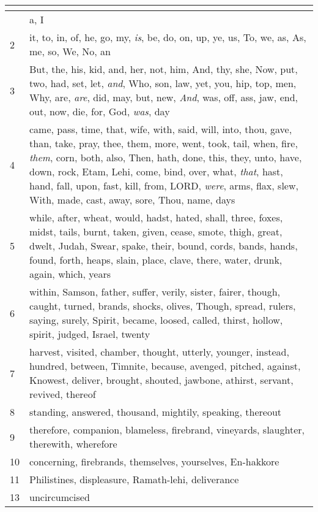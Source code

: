 \begin{center}
\begin{longtable}{l|p{3.75in}}
\hline \multicolumn{2}{c}{{ }} \\ \hline
\endfoot 
1 & a, I\\ \hline 
2 & it, to, in, of, he, go, my, \emph{is}, be, do, on, up, ye, us, To, we, as, As, me, so, We, No, an\\ \hline 
3 & But, the, his, kid, and, her, not, him, And, thy, she, Now, put, two, had, set, let, \emph{and}, Who, son, law, yet, you, hip, top, men, Why, are, \emph{are}, did, may, but, new, \emph{And}, was, off, ass, jaw, end, out, now, die, for, God, \emph{was}, day\\ \hline 
4 & came, pass, time, that, wife, with, said, will, into, thou, gave, than, take, pray, thee, them, more, went, took, tail, when, fire, \emph{them}, corn, both, also, Then, hath, done, this, they, unto, have, down, rock, Etam, Lehi, come, bind, over, what, \emph{that}, hast, hand, fall, upon, fast, kill, from, LORD, \emph{were}, arms, flax, slew, With, made, cast, away, sore, Thou, name, days\\ \hline 
5 & while, after, wheat, would, hadst, hated, shall, three, foxes, midst, tails, burnt, taken, given, cease, smote, thigh, great, dwelt, Judah, Swear, spake, their, bound, cords, bands, hands, found, forth, heaps, slain, place, clave, there, water, drunk, again, which, years\\ \hline 
6 & within, Samson, father, suffer, verily, sister, fairer, though, caught, turned, brands, shocks, olives, Though, spread, rulers, saying, surely, Spirit, became, loosed, called, thirst, hollow, spirit, judged, Israel, twenty\\ \hline 
7 & harvest, visited, chamber, thought, utterly, younger, instead, hundred, between, Timnite, because, avenged, pitched, against, Knowest, deliver, brought, shouted, jawbone, athirst, servant, revived, thereof\\ \hline 
8 & standing, answered, thousand, mightily, speaking, thereout\\ \hline 
9 & therefore, companion, blameless, firebrand, vineyards, slaughter, therewith, wherefore\\ \hline 
10 & concerning, firebrands, themselves, yourselves, En-hakkore\\ \hline 
11 & Philistines, displeasure, Ramath-lehi, deliverance\\ \hline 
13 & uncircumcised\\ \hline 
\end{longtable}
\end{center}





